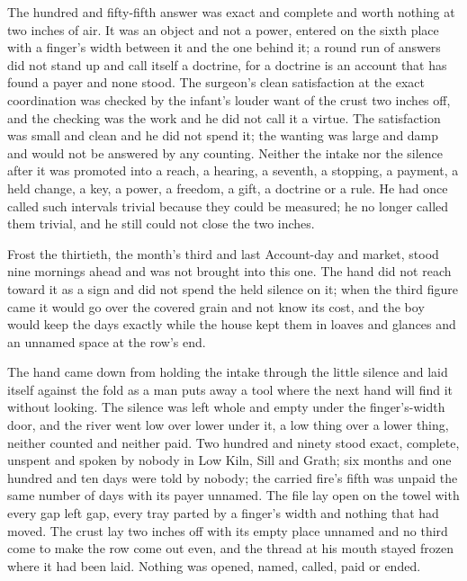 The hundred and fifty-fifth answer was exact and complete and worth nothing at two inches of air. It was an object and not a power, entered on the sixth place with a finger's width between it and the one behind it; a round run of answers did not stand up and call itself a doctrine, for a doctrine is an account that has found a payer and none stood. The surgeon's clean satisfaction at the exact coordination was checked by the infant's louder want of the crust two inches off, and the checking was the work and he did not call it a virtue. The satisfaction was small and clean and he did not spend it; the wanting was large and damp and would not be answered by any counting. Neither the intake nor the silence after it was promoted into a reach, a hearing, a seventh, a stopping, a payment, a held change, a key, a power, a freedom, a gift, a doctrine or a rule. He had once called such intervals trivial because they could be measured; he no longer called them trivial, and he still could not close the two inches.

Frost the thirtieth, the month's third and last Account-day and market, stood nine mornings ahead and was not brought into this one. The hand did not reach toward it as a sign and did not spend the held silence on it; when the third figure came it would go over the covered grain and not know its cost, and the boy would keep the days exactly while the house kept them in loaves and glances and an unnamed space at the row's end.

The hand came down from holding the intake through the little silence and laid itself against the fold as a man puts away a tool where the next hand will find it without looking. The silence was left whole and empty under the finger's-width door, and the river went low over lower under it, a low thing over a lower thing, neither counted and neither paid. Two hundred and ninety stood exact, complete, unspent and spoken by nobody in Low Kiln, Sill and Grath; six months and one hundred and ten days were told by nobody; the carried fire's fifth was unpaid the same number of days with its payer unnamed. The file lay open on the towel with every gap left gap, every tray parted by a finger's width and nothing that had moved. The crust lay two inches off with its empty place unnamed and no third come to make the row come out even, and the thread at his mouth stayed frozen where it had been laid. Nothing was opened, named, called, paid or ended.
